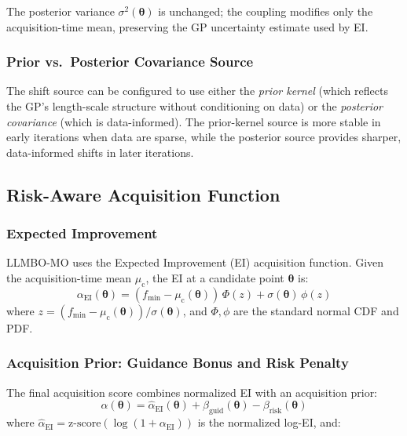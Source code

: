 \documentclass[journal]{IEEEtran}
\newcommand{\btheta}{\boldsymbol{\theta}}
\begin{document}
The posterior variance $\sigma^2(\btheta)$ is unchanged; the coupling modifies only the acquisition-time mean, preserving the GP uncertainty estimate used by EI.

\subsubsection{Prior vs.\ Posterior Covariance Source}

The shift source can be configured to use either the \emph{prior kernel} (which reflects the GP's length-scale structure without conditioning on data) or the \emph{posterior covariance} (which is data-informed). The prior-kernel source is more stable in early iterations when data are sparse, while the posterior source provides sharper, data-informed shifts in later iterations.

\subsection{Risk-Aware Acquisition Function}
\label{sec:acquisition}

\subsubsection{Expected Improvement}

LLMBO-MO uses the Expected Improvement (EI) acquisition function. Given the acquisition-time mean $\mu_{\text{c}}$, the EI at a candidate point $\btheta$ is:
\begin{equation}
\alpha_{\text{EI}}(\btheta) = (f_{\min} - \mu_{\text{c}}(\btheta))\, \Phi(z) + \sigma(\btheta)\, \phi(z)
\label{eq:ei}
\end{equation}
where $z = (f_{\min} - \mu_{\text{c}}(\btheta)) / \sigma(\btheta)$, and $\Phi, \phi$ are the standard normal CDF and PDF.

\subsubsection{Acquisition Prior: Guidance Bonus and Risk Penalty}

The final acquisition score combines normalized EI with an acquisition prior:
\begin{equation}
\alpha(\btheta) = \hat{\alpha}_{\text{EI}}(\btheta) + \beta_{\text{guid}}(\btheta) - \beta_{\text{risk}}(\btheta)
\label{eq:acq_prior}
\end{equation}
where $\hat{\alpha}_{\text{EI}} = \text{z-score}(\log(1 + \alpha_{\text{EI}}))$ is the normalized log-EI, and:
\end{document}
